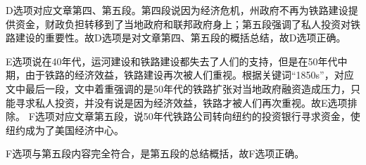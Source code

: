 \begin{blk}
\begin{nlz}
        D选项对应文章第四、第五段。第四段说因为经济危机，州政府不再为铁路建设提供资金，财政负担转移到了当地政府和联邦政府身上；第五段强调了私人投资对铁路建设的重要性。故D选项是对文章第四、第五段的概括总结，故D选项正确。

        E选项说在40年代，运河建设和铁路建设都失去了人们的支持，但是在50年代中期，由于铁路的经济效益，铁路建设再次被人们重视。根据关键词“1850s”，对应文中最后一段，文中着重强调的是50年代的铁路扩张对当地政府融资造成压力，只能寻求私人投资，并没有说是因为经济效益，铁路才被人们再次重视。故E选项排除。  F选项对应文章第五段，说50年代铁路公司转向纽约的投资银行寻求资金，使纽约成为了美国经济中心。

        F选项与第五段内容完全符合，是第五段的总结概括，故F选项正确。
    \end{nlz}
\end{blk}
